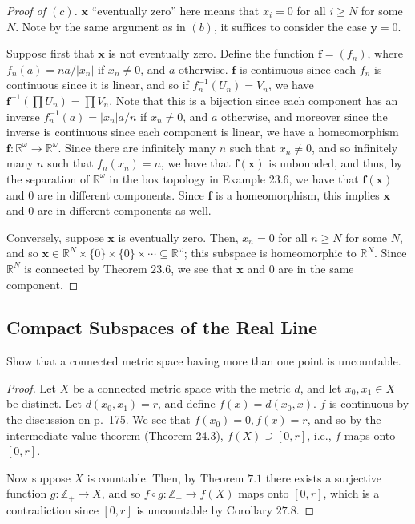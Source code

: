 \documentclass[12pt]{article}
\theoremstyle{remark}
\begin{document}
\begin{proof}[Proof of $(c)$]
  $\mathbf{x}$ ``eventually zero'' here means that $x_i = 0$ for all $i \ge N$ for some $N$. Note by the same argument as in $(b)$, it suffices to consider the case $\mathbf{y} = 0$.
  \par Suppose first that $\mathbf{x}$ is not eventually zero. Define the
  function $\mathbf{f} = (f_n)$, where $f_n(a) = na/|x_n|$ if $x_n \ne 0$, and
  $a$ otherwise. $\mathbf{f}$ is continuous since each $f_n$ is continuous since
  it is linear, and so if $f_n^{-1}(U_n) = V_n$, we have $\mathbf{f}^{-1}(\prod
  U_n) = \prod V_n$. Note that this is a bijection since each component has an
  inverse $f_n^{-1}(a) = |x_n|a/n$ if $x_n \ne 0$, and $a$ otherwise, and
  moreover since the inverse is continuous since each component is linear, we
  have a homeomorphism $\mathbf{f}\colon \mathbb{R}^\omega \to \mathbb{R}^\omega$. Since there are infinitely many $n$ such that $x_n \ne 0$, and so infinitely many $n$ such that $f_n(x_n) = n$, we have that $\mathbf{f}(\mathbf{x})$ is unbounded, and thus, by the separation of $\mathbb{R}^\omega$ in the box topology in Example 23.6, we have that $\mathbf{f}(\mathbf{x})$ and $0$ are in different components. Since $\mathbf{f}$ is a homeomorphism, this implies $\mathbf{x}$ and $0$ are in different components as well.
  \par Conversely, suppose $\mathbf{x}$ is eventually zero. Then, $x_n = 0$ for
  all $n \ge N$ for some $N$, and so $\mathbf{x} \in \mathbb{R}^N \times \{0\}
  \times \{0\} \times \cdots \subseteq \mathbb{R}^\omega$; this subspace is
  homeomorphic to $\mathbb{R}^N$. Since $\mathbb{R}^N$ is connected by Theorem $23.6$, we see that $\mathbf{x}$ and $0$ are in the same component.
\end{proof}

\setcounter{subsection}{26}
\subsection{Compact Subspaces of the Real Line}
\setcounter{subsubsection}{3}
\begin{problem}
  Show that a connected metric space having more than one point is uncountable.
\end{problem}
\begin{proof}
  Let $X$ be a connected metric space with the metric $d$, and let $x_0,x_1 \in
  X$ be distinct. Let $d(x_0,x_1) = r$, and define $f(x) = d(x_0,x)$. $f$ is
  continuous by the discussion on p.~175. We see that $f(x_0) = 0, f(x) = r$, and so by the intermediate value theorem (Theorem 24.3), $f(X) \supseteq [0,r]$, i.e., $f$ maps onto $[0,r]$.
  \par Now suppose $X$ is countable. Then, by Theorem $7.1$ there exists a
  surjective function $g\colon \mathbb{Z}_+ \to X$, and so $f \circ g\colon \mathbb{Z}_+ \to f(X)$ maps onto $[0,r]$, which is a contradiction since $[0,r]$ is uncountable by Corollary $27.8$.
\end{proof}
\end{document}
